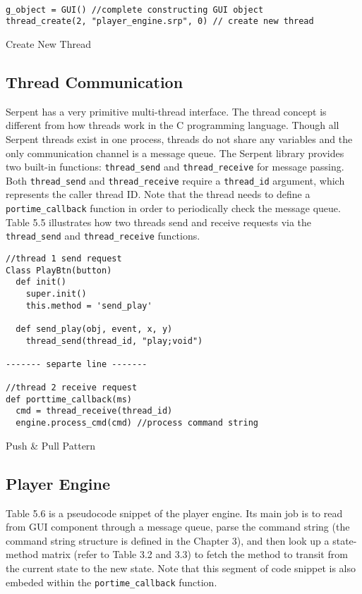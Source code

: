 \begin{table}[htdp]
\centering

\begin{lstlisting}

g_object = GUI() //complete constructing GUI object
thread_create(2, "player_engine.srp", 0) // create new thread

\end{lstlisting}

\caption[Create New Thread]{Create New Thread}
\end{table}

\subsection{Thread Communication}

Serpent has a very primitive multi-thread interface. The thread concept is 
different from how threads work in the C programming language. Though all Serpent 
threads exist in one process, threads do not share any variables and the only 
communication channel is a message queue. The Serpent library provides two
built-in functions: \texttt{thread\_send} and \texttt{thread\_receive} 
for message passing. Both \texttt{thread\_send} and \texttt{thread\_receive}
require a \texttt{thread\_id} argument, which represents the caller thread ID. 
Note that the thread needs to define a \texttt{portime\_callback} function
in order to periodically check the message queue. Table 5.5 illustrates how 
two threads send and receive requests via the \texttt{thread\_send} and 
\texttt{thread\_receive} functions.
\begin{table}[htdp]
\centering
\begin{lstlisting}
//thread 1 send request 
Class PlayBtn(button)
  def init()
    super.init()
    this.method = 'send_play'

  def send_play(obj, event, x, y)
    thread_send(thread_id, "play;void")

------- separte line -------

//thread 2 receive request 
def porttime_callback(ms)
  cmd = thread_receive(thread_id)
  engine.process_cmd(cmd) //process command string
\end{lstlisting}
\caption[Push \& Pull Pattern]{Push \& Pull Pattern}
\end{table}

\subsection{Player Engine}
Table 5.6 is a pseudocode snippet of the player engine. Its main job is to read 
from GUI component through a message queue, parse the command string (the  
command string structure is defined in the Chapter 3), and then look up a state-method 
matrix (refer to Table 3.2 and 3.3) to fetch the method to transit from the 
current state to the new state. Note that this segment of code snippet is also 
embeded within the \texttt{portime\_callback} function.


